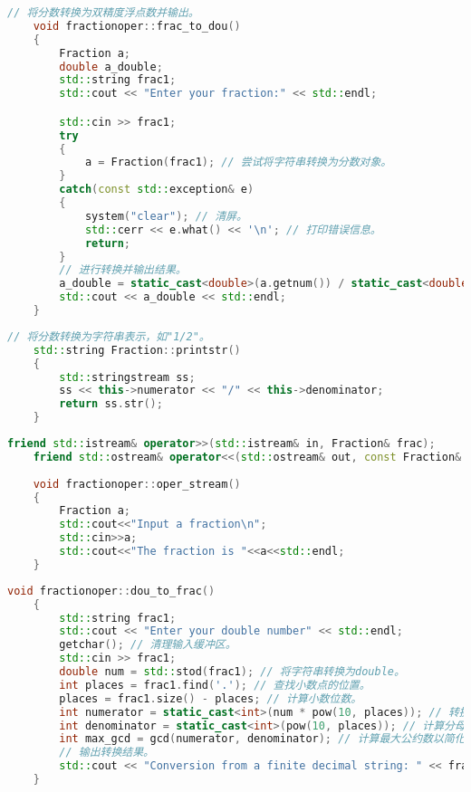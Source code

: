 \documentclass{ctexart} %
\begin{document}
\vspace{10pt}
\begin{lstlisting}[language = c++, caption=6.Typecast to double]
    // 将分数转换为双精度浮点数并输出。
    void fractionoper::frac_to_dou()
    {
        Fraction a;
        double a_double;
        std::string frac1;
        std::cout << "Enter your fraction:" << std::endl;

        std::cin >> frac1;
        try
        {
            a = Fraction(frac1); // 尝试将字符串转换为分数对象。
        }
        catch(const std::exception& e)
        {
            system("clear"); // 清屏。
            std::cerr << e.what() << '\n'; // 打印错误信息。
            return;
        }
        // 进行转换并输出结果。
        a_double = static_cast<double>(a.getnum()) / static_cast<double>(a.getden());
        std::cout << a_double << std::endl;
    }

\end{lstlisting}

\vspace{10pt}
\begin{lstlisting}[language = c++, caption=7.To string]
    // 将分数转换为字符串表示，如"1/2"。
    std::string Fraction::printstr()
    {
        std::stringstream ss;
        ss << this->numerator << "/" << this->denominator;
        return ss.str();
    }

\end{lstlisting}

\vspace{10pt}
\begin{lstlisting}[language = c++, caption=8.Inserter and extractor for streams]
    friend std::istream& operator>>(std::istream& in, Fraction& frac);
    friend std::ostream& operator<<(std::ostream& out, const Fraction& frac);     
    
    void fractionoper::oper_stream()
    {
        Fraction a;
        std::cout<<"Input a fraction\n";
        std::cin>>a;
        std::cout<<"The fraction is "<<a<<std::endl;
    }
\end{lstlisting}

\vspace{10pt}
\begin{lstlisting}[language = c++, caption=9.Conversion from a finite decimal string like: 1.414]
    void fractionoper::dou_to_frac()
    {
        std::string frac1;
        std::cout << "Enter your double number" << std::endl;
        getchar(); // 清理输入缓冲区。
        std::cin >> frac1;
        double num = std::stod(frac1); // 将字符串转换为double。
        int places = frac1.find('.'); // 查找小数点的位置。
        places = frac1.size() - places; // 计算小数位数。
        int numerator = static_cast<int>(num * pow(10, places)); // 转换为分子。
        int denominator = static_cast<int>(pow(10, places)); // 计算分母。
        int max_gcd = gcd(numerator, denominator); // 计算最大公约数以简化分数。
        // 输出转换结果。
        std::cout << "Conversion from a finite decimal string: " << frac1 << " to a fraction is " << numerator / max_gcd << "/" << denominator / max_gcd << std::endl;
    }
\end{lstlisting}
\end{document}
